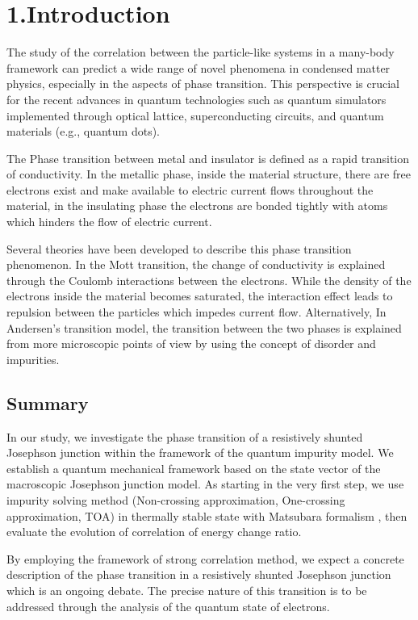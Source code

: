 \documentclass{article}[12pt]
\begin{document}
\section*{1.Introduction}
\begin{spacing}{1.5}

The study of the correlation between the particle-like systems in a many-body framework can predict a wide range of novel phenomena in condensed matter physics, especially in the aspects of phase transition. 
This perspective is crucial for the recent advances in quantum technologies such as quantum simulators implemented through optical lattice, superconducting circuits, and quantum materials (e.g., quantum dots).

The Phase transition between metal and insulator is defined as a rapid transition of conductivity. In the metallic phase, inside the material structure, there are free electrons exist and make available to electric current flows throughout the material, in the insulating phase the electrons are bonded tightly with atoms which hinders the flow of electric current.

Several theories have been developed to describe this phase transition phenomenon. In the Mott transition, the change of conductivity is explained through the Coulomb interactions between the electrons. While the density of the electrons inside the material becomes saturated, the interaction effect leads to repulsion between the particles which impedes current flow. Alternatively, In Andersen's transition model, the transition between the two phases is explained from more microscopic points of view by using the concept of disorder and impurities.

\subsection*{Summary}
In our study, we investigate the phase transition of a resistively shunted Josephson junction within the framework of the quantum impurity model. 
We establish a quantum mechanical framework based on the state vector of the macroscopic Josephson junction model. 
As starting in the very first step, we use impurity solving method (Non-crossing approximation, One-crossing approximation, TOA) in thermally stable state with Matsubara formalism , then evaluate the evolution of correlation of energy change ratio.

By employing the framework of strong correlation method, we expect a concrete description of the phase transition in a resistively shunted Josephson junction which is an ongoing debate. The precise nature of this transition is to be addressed through the analysis of the quantum state of electrons.
\end{spacing}
\end{document}
